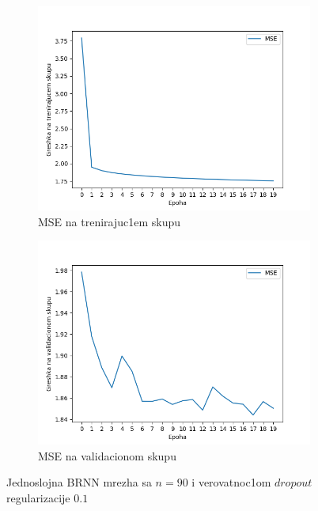 \documentclass[a4paper, openany, oneside, 11pt]{book}
\begin{document}
\begin{figure}[!h]
        \centering
        \begin{subfigure}{0.475\textwidth}
            \centering
            \includegraphics[scale=0.43]{res/SL_BLSTM_90units_d01_train.png}
            \caption{\acrshort{MSE} na trenirajuc1em skupu}
            \label{fig:4_13a}
            \vspace{0pt}
        \end{subfigure}%
        \begin{subfigure}{0.475\textwidth}
            \centering
            \includegraphics[scale=0.43]{res/SL_BLSTM_90units_d01_validation.png}
            \caption{\acrshort{MSE} na validacionom skupu}
            \label{fig:4_13b}
            \vspace{0pt}
        \end{subfigure}
        \caption{Jednoslojna \acrshort{BRNN} mrezha sa $n=90$ i verovatnoc1om $dropout$ regularizacije $0.1$}
        \label{fig:4_13}
\end{figure}
\end{document}
